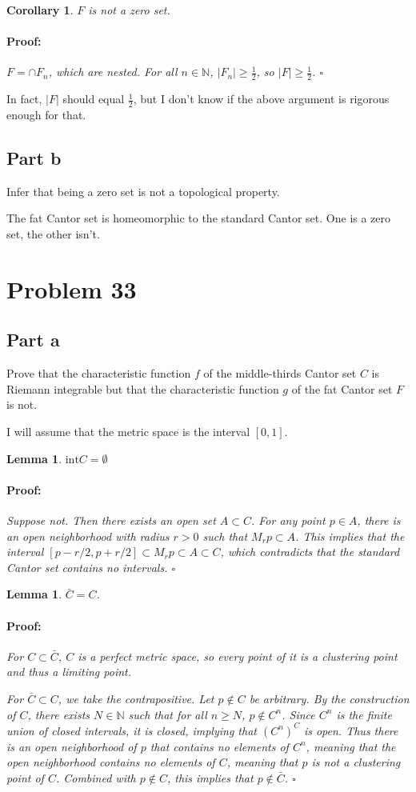\documentclass{article}
\newenvironment{proof}{\paragraph{Proof:}}{\hfill$\square$}
\newtheorem{lemma}[theorem]{Lemma}
\newtheorem{corollary}[theorem]{Corollary}
\newcommand{\N}{\mathbb{N}}
\newcommand{\inter}{\text{int}}
\begin{document}
\begin{corollary}
$F$ is not a zero set.
\begin{proof}
$F = \cap F_n$, which are nested. For all $n \in \N$, $|F_n| \geq \frac{1}{2}$, so $|F| \geq \frac{1}{2}$.
\end{proof}
\end{corollary}

In fact, $|F|$ should equal $\frac{1}{2}$, but I don't know if the above argument is rigorous enough for that.

\subsection*{Part b}

Infer that being a zero set is not a topological property.

The fat Cantor set is homeomorphic to the standard Cantor set. One is a zero set, the other isn't.

\section*{Problem 33}

\subsection*{Part a}

Prove that the characteristic function $f$ of the middle-thirds Cantor set $C$ is Riemann integrable but that the characteristic function $g$ of the fat Cantor set $F$ is not.

I will assume that the metric space is the interval $[0, 1]$.

\begin{lemma}
\label{InterCIsEmpty}
$\inter C = \emptyset$
\begin{proof}
Suppose not. Then there exists an open set $A \subset C$. For any point $p \in A$, there is an open neighborhood with radius $r > 0$ such that $M_r p \subset A$. This implies that the interval $[p-r/2, p+r/2] \subset M_r p \subset A \subset C$, which contradicts that the standard Cantor set contains no intervals.
\end{proof}
\end{lemma}

\begin{lemma}
\label{BarCIsC}
$\bar{C} = C$.
\begin{proof}
For $C \subset \bar{C}$, $C$ is a perfect metric space, so every point of it is a clustering point and thus a limiting point.

For $\bar{C} \subset C$, we take the contrapositive. Let $p \notin C$ be arbitrary. By the construction of $C$, there exists $N \in \N$ such that for all $n \geq N$, $p \notin C^n$. Since $C^n$ is the finite union of closed intervals, it is closed, implying that $(C^n)^C$ is open. Thus there is an open neighborhood of $p$ that contains no elements of $C^n$, meaning that the open neighborhood contains no elements of $C$, meaning that $p$ is not a clustering point of $C$. Combined with $p \notin C$, this implies that $p \notin \bar{C}$.
\end{proof}
\end{lemma}
\end{document}

